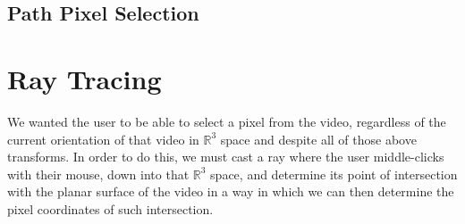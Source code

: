 \subsection{Path Pixel Selection}



\section{Ray Tracing}
We wanted the user to be able to select a pixel from the video, regardless of the current orientation of that video in $\mathbb{R}^3$ space and despite all of those above transforms. In order to do this, we must cast a ray where the user middle-clicks with their mouse, down into that $\mathbb{R}^3$ space, and determine its point of intersection with the planar surface of the video in a way in which we can then determine the pixel coordinates of such intersection.\par
